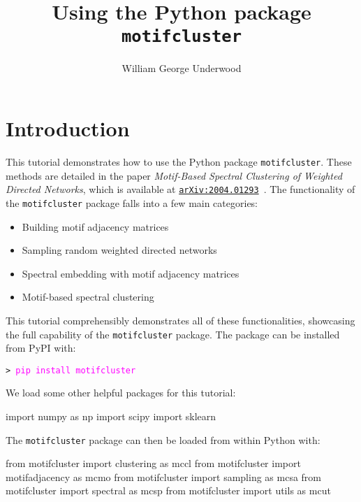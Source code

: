 \documentclass{article}
\title{Using the Python package \texttt{motifcluster}}
\author{William George Underwood}
\begin{document}
\maketitle
\tableofcontents

\pagebreak

\section{Introduction}

This tutorial demonstrates how to use the Python package \texttt{motifcluster}.
These methods are detailed in the paper
\textit{Motif-Based Spectral Clustering of Weighted Directed Networks},
which is available at
\href{https://arxiv.org/abs/2004.01293}{\texttt{arXiv:2004.01293}}~\cite{UnderwoodElliottCucuringu_2020_Motifs}.
The functionality of the \texttt{motifcluster} package falls into a few main
categories:

\begin{itemize}
\item Building motif adjacency matrices
\item Sampling random weighted directed networks
\item Spectral embedding with motif adjacency matrices
\item Motif-based spectral clustering
\end{itemize}

This tutorial comprehensibly demonstrates all of these functionalities,
showcasing the full capability of the \texttt{motifcluster} package.
The package can be installed from PyPI with:

\vspace*{2mm}
\texttt{> \textcolor{Fuchsia}{pip install motifcluster}}
\vspace*{3mm}

We load some other helpful packages for this tutorial:
\begin{pyconsole}
import numpy as np
import scipy
import sklearn
\end{pyconsole}

\vspace*{-3mm}

The \texttt{motifcluster} package can then be loaded
from within Python with:

\begin{pyconsole}
from motifcluster import clustering as mccl
from motifcluster import motifadjacency as mcmo
from motifcluster import sampling as mcsa
from motifcluster import spectral as mcsp
from motifcluster import utils as mcut
\end{pyconsole}
\end{document}
